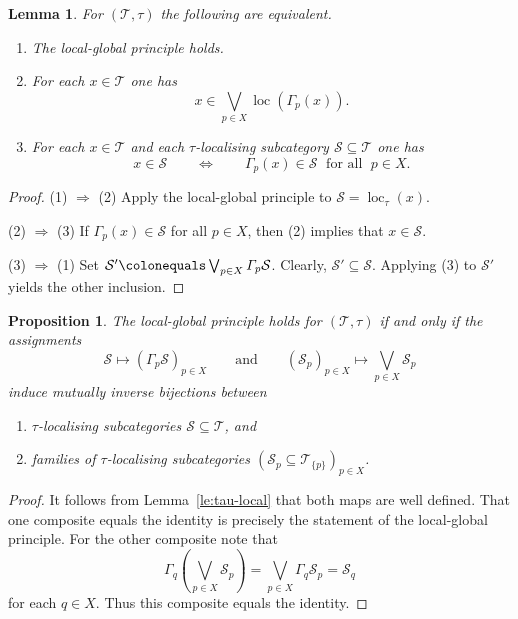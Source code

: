 \documentclass{amsart}[a4]
\newtheorem{lemma}[theorem]{Lemma}
\newtheorem{proposition}[theorem]{Proposition}
\theoremstyle{definition}
\theoremstyle{remark}
\numberwithin{equation}{section}
\newcommand{\loc}{\operatorname{loc}}
\newcommand{\cat}{\mathcal}
\let\Gamma\varGamma
\begin{document}
\begin{lemma}
  For   $(\cat T,\tau)$ the following are equivalent.
  \begin{enumerate}
  \item The local-global principle holds.
  \item For each $x\in\cat T$ one has
    \[x\in \bigvee_{p\in X}\loc(\Gamma_p(x)).\]
  \item For each $x\in\cat T$ and each $\tau$-localising subcategory
    $\cat S\subseteq\cat T$ one has
\[x\in\cat S\qquad\iff\qquad \Gamma_p(x)\in\cat S\;\text{ for all
  }\;p\in X.\]
\end{enumerate}
\end{lemma}
\begin{proof}
(1) $\Rightarrow$ (2) Apply the local-global principle to $\cat
S=\loc_\tau(x)$.

 (2) $\Rightarrow$ (3) If  $\Gamma_p(x)\in\cat S$  for all $p\in X$,
 then (2) implies that $x\in\cat S$.

 (3) $\Rightarrow$ (1) Set
 $\cat S'\colonequals \bigvee_{p\in X}\Gamma_p\cat S$. Clearly,
 $\cat S'\subseteq\cat S$.  Applying (3)  to $\cat S'$ yields the other inclusion.
\end{proof}


\begin{proposition}\label{pr:tau-local-classification}
  The local-global principle holds for $(\cat
  T,\tau)$ if and only if the assignments
  \[\cat S\mapsto (\Gamma_p\cat S)_{p\in X}\qquad\text{and}\qquad
(\cat S_p)_{p\in X}\mapsto \bigvee_{p\in X}\cat S_p\]
    induce mutually inverse bijections between
\begin{enumerate}
\item $\tau$-localising subcategories  $\cat S\subseteq\cat T$, and
\item families  of $\tau$-localising
      subcategories $(\cat S_p\subseteq\cat T_{\{p\}})_{p\in X}$.
\end{enumerate}
  \end{proposition}

\begin{proof}  
It follows from Lemma~\ref{le:tau-local} that both maps are well
defined. That one composite equals the identity is precisely the
statement of the local-global
principle. For the other composite note that
\[\Gamma_q\left( \bigvee_{p\in X}\cat S_p\right)=\bigvee_{p\in
    X}\Gamma_q\cat S_p=\cat S_q\]
for each $q\in X$. Thus this composite equals the identity.
\end{proof}
\end{document}

